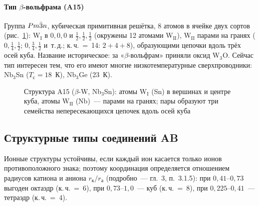 \paragraph{Тип $\beta$-вольфрама (A15)}
Группа $Pm\bar{3}n$, кубическая примитивная решётка, 8 атомов в ячейке двух
сортов (рис.~\ref{fig:a15}): W$_\text{I}$ в $0,0,0$ и $\frac12,\frac12,\frac12$ (окружены
12 атомами W$_\text{II}$), W$_\text{II}$ парами на гранях ($0,\frac14,\frac12$; $0,\frac34,\frac12$
и~т.\,д.; к.\,ч.~=~14: $2+4+8$), образующими цепочки вдоль трёх осей куба.
Название историческое: за «$\beta$-вольфрам» приняли оксид W$_3$O. Сейчас
тип интересен тем, что его имеют многие низкотемпературные
сверхпроводники: Nb$_3$Sn ($T_\text{с}=18$~К), Nb$_3$Ge (23~К).

\begin{figure}[ht]
\centering
{}
\caption{Структура A15 ($\beta$-W, Nb$_3$Sn): атомы W$_\text{I}$ (Sn) в вершинах и
центре куба, атомы W$_\text{II}$ (Nb)~— парами на гранях; пары образуют три
семейства непересекающихся цепочек вдоль осей куба}
\label{fig:a15}
\end{figure}

\subsection{Структурные типы соединений AB}\label{ssec:ab-types}

Ионные структуры устойчивы, если каждый ион касается только ионов
противоположного знака; поэтому координация определяется отношением
радиусов катиона и аниона $r_\text{к}/r_\text{а}$ (подробно~— гл.~3, п.~3.1.5):
при $0{,}41$--$0{,}73$ выгоден октаэдр (к.\,ч.~=~6), при $0{,}73$--$1{,}0$~— куб
(к.\,ч.~=~8), при $0{,}225$--$0{,}41$~— тетраэдр (к.\,ч.~=~4).

